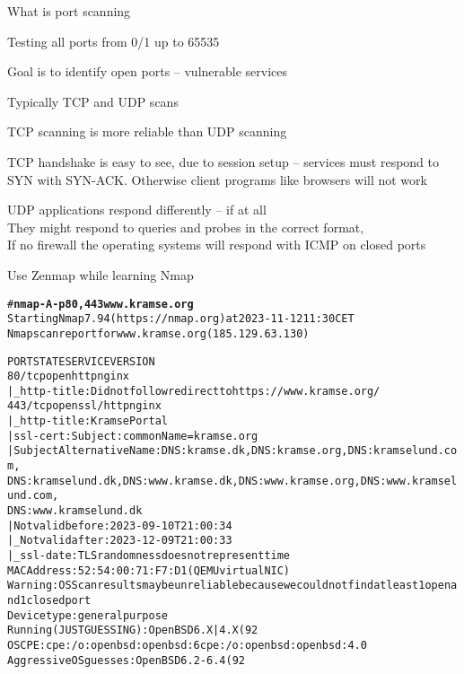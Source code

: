 \documentclass[Screen16to9,17pt]{foils}
\begin{document}
What is port scanning
\begin{list2}
\item Testing all ports from 0/1 up to 65535
\item Goal is to identify open ports -- vulnerable services
\item Typically TCP and UDP scans
\item TCP scanning is more reliable than UDP scanning
\item TCP handshake is easy to see, due to session setup -- services must respond to SYN with SYN-ACK. Otherwise client programs like browsers will not work
\item UDP applications respond differently -- if at all\\
They might respond to queries and probes in the correct format, \\
If no firewall the operating systems will respond with ICMP on closed ports
\item Use Zenmap while learning Nmap
\end{list2}



\begin{alltt}\footnotesize
# {\bf nmap -A -p 80,443 www.kramse.org}
Starting Nmap 7.94 ( https://nmap.org ) at 2023-11-12 11:30 CET
Nmap scan report for www.kramse.org (185.129.63.130)

PORT    STATE SERVICE  VERSION
{\color{darkgreen}80/tcp  open  http     nginx}
|_http-title: Did not follow redirect to https://www.kramse.org/
{\color{darkgreen}443/tcp open  ssl/http nginx}
|_http-title: Kramse Portal
| ssl-cert: Subject: commonName=kramse.org
| Subject Alternative Name: DNS:kramse.dk, DNS:kramse.org, DNS:kramselund.com,
DNS:kramselund.dk, DNS:www.kramse.dk, DNS:www.kramse.org, DNS:www.kramselund.com,
DNS:www.kramselund.dk
| Not valid before: 2023-09-10T21:00:34
|_Not valid after:  2023-12-09T21:00:33
|_ssl-date: TLS randomness does not represent time
MAC Address: 52:54:00:71:F7:D1 (QEMU virtual NIC)
Warning: OSScan results may be unreliable because we could not find at least 1 open and 1 closed port
Device type: general purpose
Running (JUST GUESSING): OpenBSD 6.X|4.X (92%)
OS CPE: cpe:/o:openbsd:openbsd:6 cpe:/o:openbsd:openbsd:4.0
Aggressive OS guesses: OpenBSD 6.2 - 6.4 (92%), OpenBSD 4.0 (90%), OpenBSD 6.1 (87%), OpenBSD 6.0 - 6.4 (85%)
\end{alltt}


\end{document}
